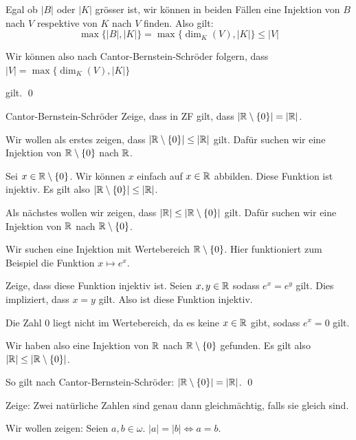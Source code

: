 \documentclass[12pt]{article}
\begin{document}
Egal ob $|B|$ oder $|K|$ grösser ist, wir können in beiden Fällen eine Injektion von $B$ nach $V$ respektive von $K$ nach $V$ finden. Also gilt:
$$
    \max\{|B|, |K|\} = \max\{\dim_K(V), |K|\} \leq |V|
$$

Wir können also nach Cantor-Bernstein-Schröder folgern, dass
$
    |V| = \max\{\dim_K(V), |K|\}
$

gilt. \qed

\begin{problem}[Aufgabe]{Cantor-Bernstein-Schröder}{}
    Zeige, dass in ZF gilt, dass $|\mathbb{R} \setminus \{0\}| = |\mathbb{R}|$.
\end{problem}

Wir wollen als erstes zeigen, dass $|\mathbb{R} \setminus \{0\}| \leq |\mathbb{R}|$ gilt. Dafür suchen wir eine Injektion von $\mathbb{R} \setminus \{0\}$ nach $\mathbb{R}$. 

Sei $x \in \mathbb{R} \setminus \{0\}$. Wir können $x$ einfach auf $x \in \mathbb{R}$ abbilden. Diese Funktion ist injektiv. Es gilt also $|\mathbb{R} \setminus \{0\}| \leq |\mathbb{R}|$.

Als nächstes wollen wir zeigen, dass $|\mathbb{R}| \leq |\mathbb{R} \setminus \{0\}|$ gilt. Dafür suchen wir eine Injektion von $\mathbb{R}$ nach $\mathbb{R} \setminus \{0\}$.

Wir suchen eine Injektion mit Wertebereich $\mathbb{R} \setminus \{0\}$. Hier funktioniert zum Beispiel die Funktion $x \mapsto e^x$. 

Zeige, dass diese Funktion injektiv ist. Seien $x, y \in \mathbb{R}$ sodass $e^x = e^y$ gilt. Dies impliziert, dass $x = y$ gilt. Also ist diese Funktion injektiv. 

Die Zahl $0$ liegt nicht im Wertebereich, da es keine $x \in \mathbb{R}$ gibt, sodass $e^x = 0$ gilt.

Wir haben also eine Injektion von $\mathbb{R}$ nach $\mathbb{R} \setminus \{0\}$ gefunden. Es gilt also $|\mathbb{R}| \leq |\mathbb{R} \setminus \{0\}|$.

So gilt nach Cantor-Bernstein-Schröder: $|\mathbb{R} \setminus \{0\}| = |\mathbb{R}|$. \qed

\begin{problem}[Aufgabe]{}{}
    Zeige: Zwei natürliche Zahlen sind genau dann gleichmächtig, falls sie gleich sind.
\end{problem}

Wir wollen zeigen: Seien $a, b \in \omega$. $|a| = |b| \iff a = b$.
\end{document}
